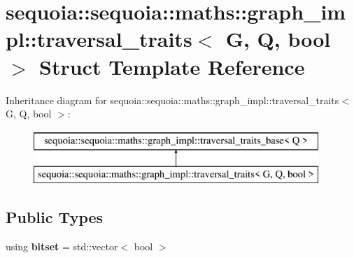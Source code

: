 \hypertarget{structsequoia_1_1sequoia_1_1maths_1_1graph__impl_1_1traversal__traits}{}\section{sequoia\+::sequoia\+::maths\+::graph\+\_\+impl\+::traversal\+\_\+traits$<$ G, Q, bool $>$ Struct Template Reference}
\label{structsequoia_1_1sequoia_1_1maths_1_1graph__impl_1_1traversal__traits}
Inheritance diagram for sequoia\+::sequoia\+::maths\+::graph\+\_\+impl\+::traversal\+\_\+traits$<$ G, Q, bool $>$\+:\begin{figure}[H]
\begin{center}
\leavevmode
\includegraphics[height=2.000000cm]{structsequoia_1_1sequoia_1_1maths_1_1graph__impl_1_1traversal__traits}
\end{center}
\end{figure}
\subsection*{Public Types}
\begin{DoxyCompactItemize}
\item 
\mbox{\label{structsequoia_1_1sequoia_1_1maths_1_1graph__impl_1_1traversal__traits_a116fe94b817ab8342d569685156bd121}} 
using {\bfseries bitset} = std\+::vector$<$ bool $>$
\end{DoxyCompactItemize}
